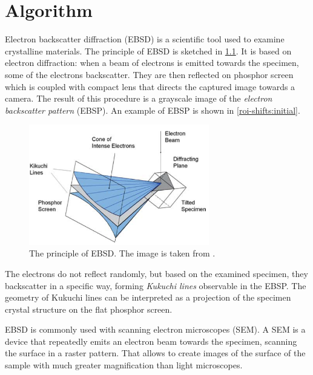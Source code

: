 \chapter{Algorithm }

Electron backscatter diffraction (EBSD) is a scientific tool used to examine crystalline materials. The principle of EBSD is sketched in \cref{ebsd-principle}. It is based on electron diffraction: when a beam of electrons is emitted towards the specimen, some of the electrons backscatter. They are then reflected on phosphor screen which is coupled with compact lens that directs the captured image towards a camera. The result of this procedure is a grayscale image of the \emph{electron backscatter pattern} (EBSP). An example of EBSP is shown in \cref{roi-shifts:initial}.

\begin{figure}
	\centering
	\includegraphics[width=0.7\textwidth]{img/ebsd_principle}
	\caption{The principle of EBSD. The image is taken from \cite{schwartz2009electron}.}
	\label{ebsd-principle}
\end{figure}


The electrons do not reflect randomly, but based on the examined specimen, they backscatter in a specific way, forming \emph{Kukuchi lines} observable in the EBSP. The geometry of Kukuchi lines can be interpreted as a projection of the specimen crystal structure on the flat phosphor screen.

EBSD is commonly used with scanning electron microscopes (SEM). A SEM is a device that repeatedly emits an electron beam towards the specimen, scanning the surface in a raster pattern. That allows to create images of the surface of the sample with much greater magnification than light microscopes.

